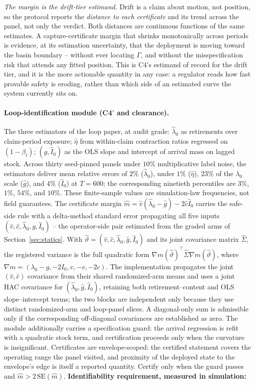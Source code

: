 \documentclass[11pt]{article}
\theoremstyle{definition}
\theoremstyle{remark}
\numberwithin{equation}{section}
\begin{document}
\emph{The margin is the drift-tier estimand.} Drift is a claim about motion, not position, so the protocol reports the \emph{distance to each certificate} and its trend across the panel, not only the verdict. Both distances are continuous functions of the same estimates. A capture-certificate margin that shrinks monotonically across periods is evidence, at its estimation uncertainty, that the deployment is moving toward the basin boundary -- without ever locating $\Gamma$, and without the misspecification risk that attends any fitted position. This is C4's estimand of record for the drift tier, and it is the more actionable quantity in any case: a regulator reads how fast provable safety is eroding, rather than which side of an estimated curve the system currently sits on.

\paragraph{Loop-identification module (C4$'$ and clearance).} The three estimators of the loop paper, at audit grade: $\hat\lambda_0$ as retirements over claim-period exposure; $\hat\eta$ from within-claim contraction ratios regressed on $(1-\beta_t)$; $(\hat g, \hat I_0)$ as the OLS slope and intercept of arrival mass on lagged stock. Across thirty seed-pinned panels under $10\%$ multiplicative label noise, the estimators deliver mean relative errors of $2\%$ ($\hat\lambda_0$), under $1\%$ ($\hat\eta$), $23\%$ of the $\lambda_0$ scale ($\hat g$), and $4\%$ ($\hat I_0$) at $T = 600$; the corresponding ninetieth percentiles are $3\%$, $1\%$, $54\%$, and $10\%$. These finite-sample values are simulation-law frequencies, not field guarantees. The certificate margin $\hat m = \hat v(\hat\lambda_0 - \hat g) - 2\hat c\hat I_0$ carries the safe-side rule with a delta-method standard error propagating all five inputs $(\hat v, \hat c, \hat\lambda_0, \hat g, \hat I_0)$ -- the operator-side pair estimated from the graded arms of Section~\ref{sec:statics}. With $\hat\vartheta=(\hat v,\hat c,\hat\lambda_0,\hat g,\hat I_0)$ and its joint covariance matrix $\widehat\Sigma$, the registered variance is the full quadratic form $\nabla m(\hat\vartheta)^\top\widehat\Sigma\nabla m(\hat\vartheta)$, where $\nabla m=(\lambda_0-g,-2I_0,v,-v,-2c)$. The implementation propagates the joint $(\hat v,\hat c)$ covariance from their shared randomized-arm means and uses a joint HAC covariance for $(\hat\lambda_0,\hat g,\hat I_0)$, retaining both retirement--content and OLS slope--intercept terms; the two blocks are independent only because they use distinct randomized-arm and loop-panel slices. A diagonal-only sum is admissible only if the corresponding off-diagonal covariances are established as zero. The module additionally carries a specification guard: the arrival regression is refit with a quadratic stock term, and certification proceeds only when the curvature is insignificant. Certificates are envelope-scoped: the certified statement covers the operating range the panel visited, and proximity of the deployed state to the envelope's edge is itself a reported quantity. Certify only when the guard passes and $\hat m > 2\,\mathrm{SE}(\hat m)$. \textbf{Identifiability requirement, measured in simulation:} 
\end{document}
